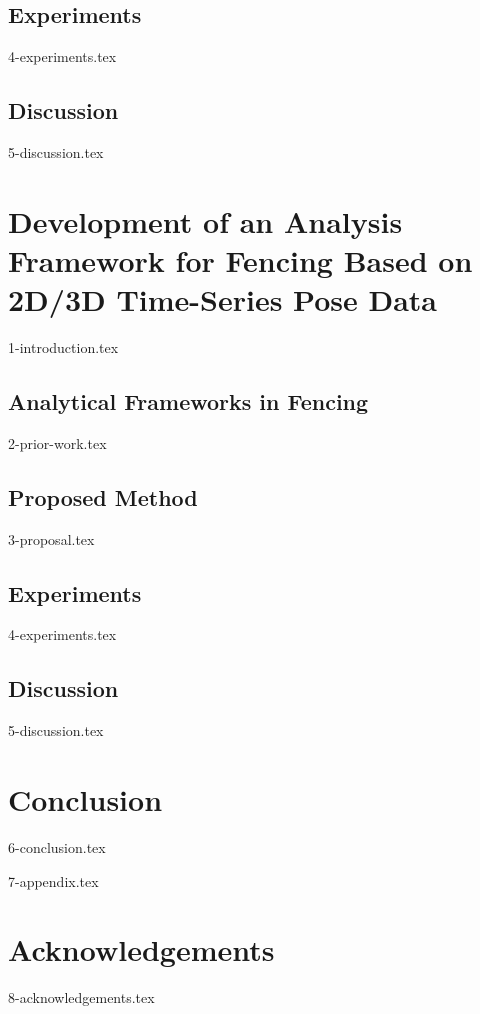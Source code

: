 \documentclass[a4paper,11pt]{report}
\let\oldsection\section
\renewcommand\section{\clearpage\oldsection}
\begin{document}
\section{Experiments}
{4-experiments.tex}

\section{Discussion}
{5-discussion.tex}

\chapter{Development of an Analysis Framework for Fencing Based on 2D/3D Time-Series Pose Data}
{1-introduction.tex}

\section{Analytical Frameworks in Fencing}
{2-prior-work.tex}

\section{Proposed Method}
{3-proposal.tex}

\section{Experiments}
{4-experiments.tex}

\section{Discussion}
{5-discussion.tex}

\chapter{Conclusion}
{6-conclusion.tex}

\begin{appendices}
	{7-appendix.tex}
\end{appendices}

\chapter*{Acknowledgements}
{8-acknowledgements.tex}

\newpage

\renewcommand{\bibname}{References}



\end{document}
